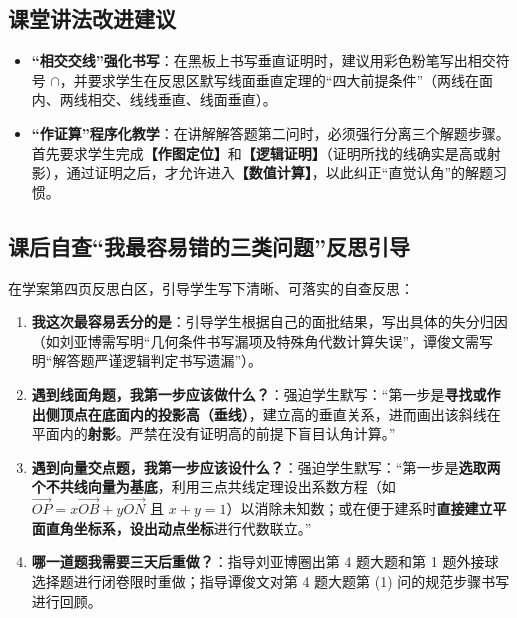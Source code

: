\documentclass[11pt,a4paper]{ctexart}
\begin{document}
\subsection{课堂讲法改进建议}
\begin{itemize}[leftmargin=2em, itemsep=0.1em, topsep=0.2em]
  \item \textbf{“相交交线”强化书写}：在黑板上书写垂直证明时，建议用彩色粉笔写出相交符号 \(\cap\)，并要求学生在反思区默写线面垂直定理的“四大前提条件”（两线在面内、两线相交、线线垂直、线面垂直）。
  \item \textbf{“作证算”程序化教学}：在讲解解答题第二问时，必须强行分离三个解题步骤。首先要求学生完成\textbf{【作图定位】}和\textbf{【逻辑证明】}（证明所找的线确实是高或射影），通过证明之后，才允许进入\textbf{【数值计算】}，以此纠正“直觉认角”的解题习惯。
\end{itemize}

\subsection{课后自查“我最容易错的三类问题”反思引导}
在学案第四页反思白区，引导学生写下清晰、可落实的自查反思：
\begin{enumerate}[label=\arabic*. , leftmargin=2em, itemsep=0.15em, topsep=0.2em]
  \item \textbf{我这次最容易丢分的是}：引导学生根据自己的面批结果，写出具体的失分归因（如刘亚博需写明“几何条件书写漏项及特殊角代数计算失误”，谭俊文需写明“解答题严谨逻辑判定书写遗漏”）。
  \item \textbf{遇到线面角题，我第一步应该做什么？}：强迫学生默写：“第一步是\textbf{寻找或作出侧顶点在底面内的投影高（垂线）}，建立高的垂直关系，进而画出该斜线在平面内的\textbf{射影}。严禁在没有证明高的前提下盲目认角计算。”
  \item \textbf{遇到向量交点题，我第一步应该设什么？}：强迫学生默写：“第一步是\textbf{选取两个不共线向量为基底}，利用三点共线定理设出系数方程（如 $\vec{OP} = x\vec{OB} + y\vec{ON}$ 且 $x+y=1$）以消除未知数；或在便于建系时\textbf{直接建立平面直角坐标系，设出动点坐标}进行代数联立。”
  \item \textbf{哪一道题我需要三天后重做？}：指导刘亚博圈出第 4 题大题和第 1 题外接球选择题进行闭卷限时重做；指导谭俊文对第 4 题大题第 (1) 问的规范步骤书写进行回顾。
\end{enumerate}
\end{document}
